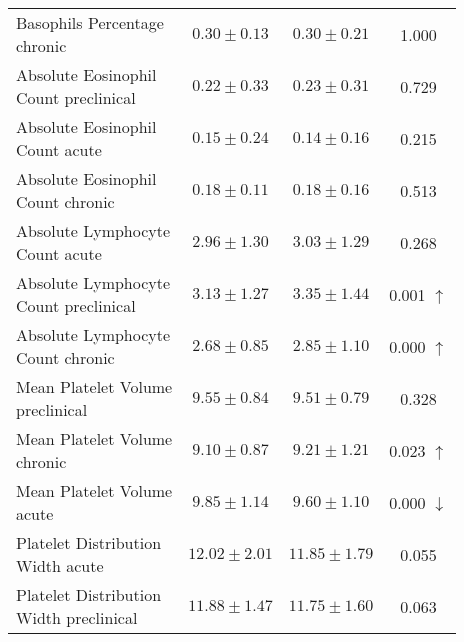 \begin{table}[htbp]
\begin{tabular}{lccc}
\makecell[l]{Basophils Percentage \\ chronic} & $0.30 \pm 0.13$ & $0.30 \pm 0.21$ & 1.000  \\

\makecell[l]{Absolute Eosinophil \\ Count preclinical} & $0.22 \pm 0.33$ & $0.23 \pm 0.31$ & 0.729  \\

\makecell[l]{Absolute Eosinophil \\ Count acute} & $0.15 \pm 0.24$ & $0.14 \pm 0.16$ & 0.215  \\

\makecell[l]{Absolute Eosinophil \\ Count chronic} & $0.18 \pm 0.11$ & $0.18 \pm 0.16$ & 0.513  \\

\makecell[l]{Absolute Lymphocyte \\ Count acute} & $2.96 \pm 1.30$ & $3.03 \pm 1.29$ & 0.268  \\

\makecell[l]{Absolute Lymphocyte \\ Count preclinical} & $3.13 \pm 1.27$ & $3.35 \pm 1.44$ & 0.001 $\uparrow$ \\

\makecell[l]{Absolute Lymphocyte \\ Count chronic} & $2.68 \pm 0.85$ & $2.85 \pm 1.10$ & 0.000 $\uparrow$ \\

\makecell[l]{Mean Platelet Volume \\ preclinical} & $9.55 \pm 0.84$ & $9.51 \pm 0.79$ & 0.328  \\

\makecell[l]{Mean Platelet Volume \\ chronic} & $9.10 \pm 0.87$ & $9.21 \pm 1.21$ & 0.023 $\uparrow$ \\

\makecell[l]{Mean Platelet Volume \\ acute} & $9.85 \pm 1.14$ & $9.60 \pm 1.10$ & 0.000 $\downarrow$ \\

\makecell[l]{Platelet Distribution \\ Width acute} & $12.02 \pm 2.01$ & $11.85 \pm 1.79$ & 0.055  \\

\makecell[l]{Platelet Distribution \\ Width preclinical} & $11.88 \pm 1.47$ & $11.75 \pm 1.60$ & 0.063  \\


\end{tabular}
\end{table}
